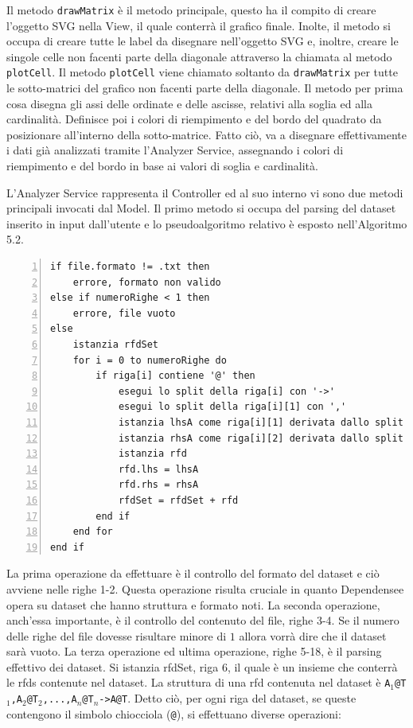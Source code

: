 Il metodo \texttt{drawMatrix} \`{e} il metodo principale, questo ha il compito di creare l'oggetto SVG nella View, il quale conterr\`{a} il grafico finale. Inolte, il metodo si occupa di creare tutte le label da disegnare nell'oggetto SVG e, inoltre, creare le singole celle non facenti parte della diagonale attraverso la chiamata al metodo \texttt{plotCell}. Il metodo \texttt{plotCell} viene chiamato soltanto da \texttt{drawMatrix} per tutte le sotto-matrici del grafico non facenti parte della diagonale. Il metodo per prima cosa disegna gli assi delle ordinate e delle ascisse, relativi alla soglia ed alla cardinalit\`{a}. Definisce poi i colori di riempimento e del bordo del quadrato da posizionare all'interno della sotto-matrice. Fatto ci\`{o}, va a disegnare effettivamente i dati gi\`{a} analizzati tramite l'Analyzer Service, assegnando i colori di riempimento e del bordo in base ai valori di soglia e cardinalit\`{a}.\par
L'Analyzer Service rappresenta il Controller ed al suo interno vi sono due metodi principali invocati dal Model.
Il primo metodo si occupa del parsing del dataset inserito in input dall'utente e lo pseudoalgoritmo relativo \`{e} esposto nell'Algoritmo 5.2.
\begin{lstlisting}[basicstyle=\footnotesize, numbers=left, xleftmargin=3em, captionpos=b, caption={Pseudocodice del metodo per il parsing dei dataset.}, label=analyzeFile_pseudo, frame=lines, breaklines=true, morekeywords={if, then, else, end, to, do, for}]
if file.formato != .txt then
    errore, formato non valido
else if numeroRighe < 1 then
    errore, file vuoto
else
    istanzia rfdSet
    for i = 0 to numeroRighe do
        if riga[i] contiene '@' then
            esegui lo split della riga[i] con '->'
            esegui lo split della riga[i][1] con ','
            istanzia lhsA come riga[i][1] derivata dallo split con '@'
            istanzia rhsA come riga[i][2] derivata dallo split con '@'
            istanzia rfd
            rfd.lhs = lhsA
            rfd.rhs = rhsA
            rfdSet = rfdSet + rfd
        end if
    end for
end if
\end{lstlisting}
La prima operazione da effettuare \`{e} il controllo del formato del dataset e ci\`{o} avviene nelle righe 1-2. Questa operazione risulta cruciale in quanto Dependensee opera su dataset che hanno struttura e formato noti. La seconda operazione, anch'essa importante, \`{e} il controllo del contenuto del file, righe 3-4. Se il numero delle righe del file dovesse risultare minore di $1$ allora vorr\`{a} dire che il dataset sar\`{a} vuoto. La terza operazione ed ultima operazione, righe 5-18, \`{e} il parsing effettivo dei dataset. Si istanzia rfdSet, riga 6, il quale \`{e} un insieme che conterr\`{a} le \acrshort{rfds} contenute nel dataset. La struttura di una \acrshort{rfd} contenuta nel dataset \`{e} \texttt{A$_1$@T$_1$,A$_2$@T$_2$,...,A$_n$@T$_n$->A@T}. Detto ci\`{o}, per ogni riga del dataset, se queste contengono il simbolo chiocciola (\texttt{@}), si effettuano diverse operazioni:
